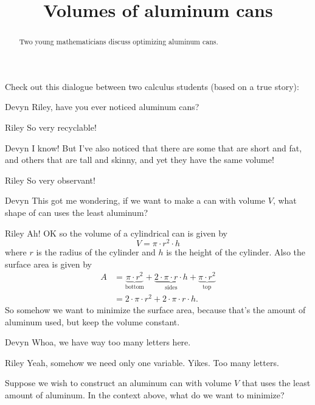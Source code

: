 \documentclass{ximera}
\title[Break-Ground:]{Volumes of aluminum cans}
\begin{document}
\begin{abstract}
Two young mathematicians discuss optimizing aluminum cans.
\end{abstract}
\maketitle

Check out this dialogue between two calculus students (based on a true
story):

\begin{dialogue}
\item[Devyn] Riley, have you ever noticed aluminum cans?
\item[Riley] So very recyclable! 
\item[Devyn] I know! But I've also noticed that there are some that
  are short and fat, and others that are tall and skinny, and yet they
  have the same volume!
\item[Riley] So very observant! 
\item[Devyn] This got me wondering, if we want to make a can with
  volume $V$, what shape of can uses the least aluminum?
\item[Riley] Ah! OK so the volume of a cylindrical can is given by
  \[
  V = \pi \cdot r^2 \cdot h
  \]
  where $r$ is the radius of the cylinder and $h$ is the height of the
  cylinder. Also the surface area is given by
  \begin{align*}
    A &= \underbrace{\pi \cdot r^2}_{\text{bottom}} + \underbrace{2\cdot\pi \cdot r\cdot h}_{\text{sides}} + \underbrace{\pi \cdot r^2}_{\text{top}}\\
    &= 2\cdot \pi \cdot r^2 + 2\cdot\pi \cdot r\cdot h.    
  \end{align*}
  So somehow we want to minimize the surface area, because that's the
  amount of aluminum used, but keep the volume constant.
\item[Devyn] Whoa, we have way too many letters here.
\item[Riley] Yeah, somehow we need only one variable. Yikes. Too many letters.
\end{dialogue}

\begin{problem}
  Suppose we wish to construct an aluminum can with volume $V$ that
  uses the least amount of aluminum. In the context above, what do we
  want to minimize?
  \begin{multipleChoice}
  \end{multipleChoice}
\end{problem}
\end{document}
